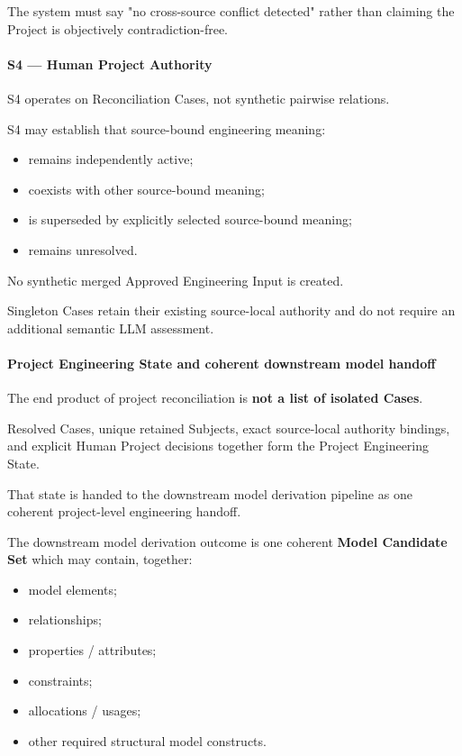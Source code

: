 The system must say "no cross-source conflict detected" rather than claiming the Project is objectively contradiction-free.

\hypertarget{s4--human-project-authority}{%
\paragraph{S4 --- Human Project Authority}\label{s4--human-project-authority}}

S4 operates on Reconciliation Cases, not synthetic pairwise relations.

S4 may establish that source-bound engineering meaning:

\begin{itemize}
\tightlist
\item
  remains independently active;
\item
  coexists with other source-bound meaning;
\item
  is superseded by explicitly selected source-bound meaning;
\item
  remains unresolved.
\end{itemize}

No synthetic merged Approved Engineering Input is created.

Singleton Cases retain their existing source-local authority and do not require an additional semantic LLM assessment.

\hypertarget{project-engineering-state-and-coherent-downstream-model-handoff}{%
\paragraph{Project Engineering State and coherent downstream model handoff}\label{project-engineering-state-and-coherent-downstream-model-handoff}}

The end product of project reconciliation is \textbf{not a list of isolated Cases}.

Resolved Cases, unique retained Subjects, exact source-local authority bindings, and explicit Human Project decisions together form the Project Engineering State.

That state is handed to the downstream model derivation pipeline as one coherent project-level engineering handoff.

The downstream model derivation outcome is one coherent \textbf{Model Candidate Set} which may contain, together:

\begin{itemize}
\tightlist
\item
  model elements;
\item
  relationships;
\item
  properties / attributes;
\item
  constraints;
\item
  allocations / usages;
\item
  other required structural model constructs.
\end{itemize}


